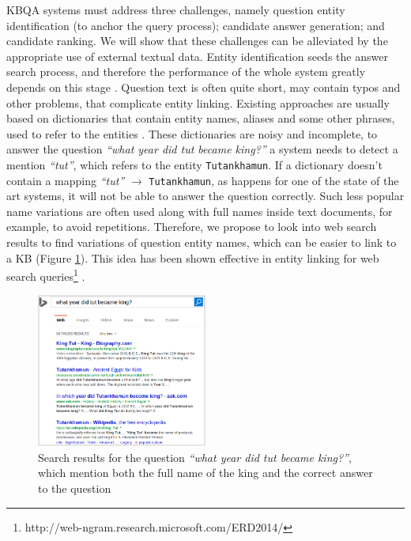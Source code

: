 KBQA systems must address three challenges, namely question entity identification (to anchor the query process); candidate answer generation; and candidate ranking.
We will show that these challenges can be alleviated by the appropriate use of external textual data.
Entity identification seeds the answer search process, and therefore the performance of the whole system greatly depends on this stage \cite{yao-scratch-qa-naacl2015}.
Question text is often quite short, may contain typos and other problems, that complicate entity linking.
Existing approaches are usually based on dictionaries that contain entity names, aliases and some other phrases, used to refer to the entities \cite{SPITKOVSKY12.266}.
These dictionaries are noisy and incomplete, \eg to answer the question \textit{``what year did tut became king?''} a system needs to detect a mention \textit{``tut''}, which refers to the entity \texttt{Tutankhamun}.
If a dictionary doesn't contain a mapping \textit{``tut''} $\rightarrow$ \texttt{Tutankhamun}, as happens for one of the state of the art systems, it will not be able to answer the question correctly.
Such less popular name variations are often used along with full names inside text documents, for example, to avoid repetitions.
Therefore, we propose to look into web search results to find variations of question entity names, which can be easier to link to a KB (Figure \ref{figure:text2kb:web_search_entitylink}).
This idea has been shown effective in entity linking for web search queries\footnote{http://web-ngram.research.microsoft.com/ERD2014/} \cite{SMAPH_ERD:2014}.

\begin{figure}[!ht]
\centering
\includegraphics[width=0.5\textwidth]{img/web_search_entitylink}
\caption{Search results for the question \textit{``what year did tut became king?''}, which mention both the full name of the king and the correct answer to the question}
\label{figure:text2kb:web_search_entitylink}
\end{figure}

